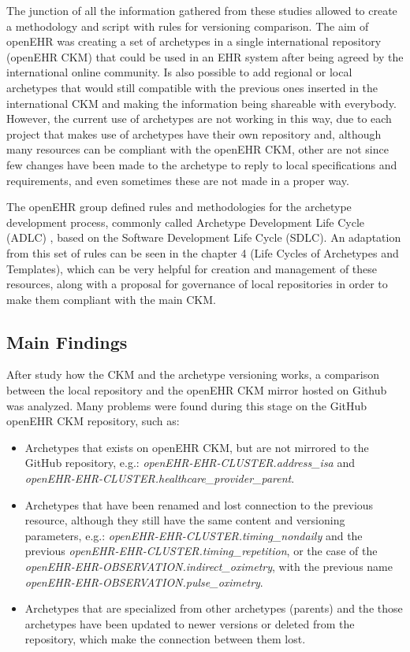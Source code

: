 \documentclass[mim_thesis.tex]{subfiles}
\begin{document}
The junction of all the information gathered from these studies allowed to create a methodology and script with rules for versioning comparison. The aim of openEHR was creating a set of archetypes in a single international repository (openEHR CKM) that could be used in an EHR system after being agreed by the international online community. Is also possible to add regional or local archetypes that would still compatible with the previous ones inserted in the international CKM and making the information being shareable with everybody. However, the current use of archetypes are not working in this way, due to each project that makes use of archetypes have their own repository and, although many resources can be compliant with the openEHR CKM, other are not since few changes have been made to the archetype to reply to local specifications and requirements, and even sometimes these are not made in a proper way. 

The openEHR group defined rules and methodologies for the archetype development process, commonly called Archetype Development Life Cycle (ADLC) \citep{Madsen2010}, based on the Software Development Life Cycle (SDLC). An adaptation from this set of rules can be seen in the chapter 4 (Life Cycles of Archetypes and Templates), which can be very helpful for creation and management of these resources, along with a proposal for governance of local repositories in order to make them compliant with the main CKM.



\subsection{Main Findings}
After study how the CKM and the archetype versioning works, a comparison between the local repository and the openEHR CKM mirror hosted on Github was analyzed. Many problems were found during this stage on the GitHub openEHR CKM repository, such as:

\begin{itemize}
\item Archetypes that exists on openEHR CKM, but are not mirrored to the GitHub repository, e.g.: \textit{openEHR-EHR-CLUSTER.address\_isa} and \textit{openEHR-EHR-CLUSTER.healthcare\_provider\_parent}.
\item Archetypes that have been renamed and lost connection to the previous resource, although they still have the same content and versioning parameters, e.g.: \textit{openEHR-EHR-CLUSTER.timing\_nondaily} and the previous \textit{openEHR-EHR-CLUSTER.timing\_repetition}, or the case of the \textit{openEHR-EHR-OBSERVATION.indirect\_oximetry}, with the previous name \textit{openEHR-EHR-OBSERVATION.pulse\_oximetry}. 
\item Archetypes that are specialized from other archetypes (parents) and the those archetypes have been updated to newer versions or deleted from the repository, which make the connection between them lost.
\end{itemize}
\end{document}
